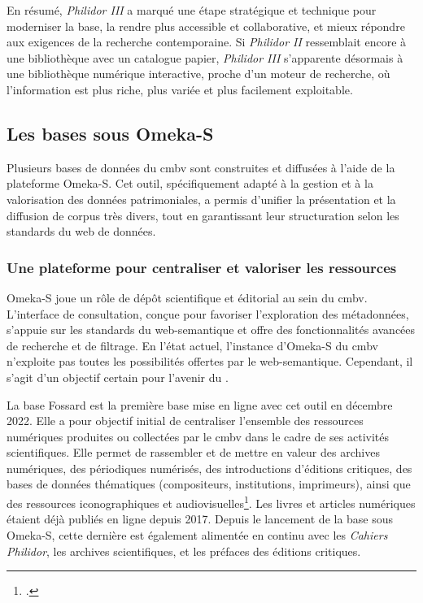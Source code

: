En résumé, \textit{Philidor III} a marqué une étape stratégique et technique pour moderniser la base, la rendre plus accessible et collaborative, et mieux répondre aux exigences de la recherche contemporaine. Si \textit{Philidor II} ressemblait encore à une bibliothèque avec un catalogue papier, \textit{Philidor III} s’apparente désormais à une bibliothèque numérique interactive, proche d’un moteur de recherche, où l’information est plus riche, plus variée et plus facilement exploitable.

\subsection{Les bases sous Omeka-S}

Plusieurs bases de données du \gls{cmbv} sont construites et diffusées à l'aide de la plateforme Omeka-S. Cet outil, spécifiquement adapté à la gestion et à la valorisation des données patrimoniales, a permis d'unifier la présentation et la diffusion de corpus très divers, tout en garantissant leur structuration selon les standards du web de données.

\subsubsection{Une plateforme pour centraliser et valoriser les ressources}

Omeka-S joue un rôle de dépôt scientifique et éditorial au sein du \gls{cmbv}. L'interface de consultation, conçue pour favoriser l'exploration des métadonnées, s'appuie sur les standards du \gls{web-semantique} et offre des fonctionnalités avancées de recherche et de filtrage. En l'état actuel, l'instance d'Omeka-S du \gls{cmbv} n'exploite pas toutes les possibilités offertes par le \gls{web-semantique}. Cependant, il s'agit d'un objectif certain pour l'avenir du .

La base Fossard est la première base mise en ligne avec cet outil en décembre 2022. Elle a pour objectif initial de centraliser l'ensemble des ressources numériques produites ou collectées par le \gls{cmbv} dans le cadre de ses activités scientifiques. Elle permet de rassembler et de mettre en valeur des archives numériques, des périodiques numérisés, des introductions d'éditions critiques, des bases de données thématiques (compositeurs, institutions, imprimeurs), ainsi que des ressources iconographiques et audiovisuelles\footcite{FossardAnnuaireMusica2}. Les livres et articles numériques étaient déjà publiés en ligne depuis 2017. Depuis le lancement de la base sous Omeka-S, cette dernière est également alimentée en continu avec les \textit{Cahiers Philidor}, les archives scientifiques, et les préfaces des éditions critiques.

